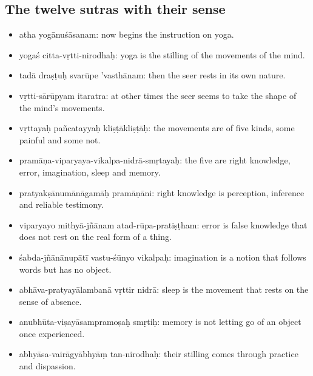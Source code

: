 \subsection*{The twelve sutras with their sense}
\begin{itemize}
\item atha yogānuśāsanam: now begins the instruction on yoga.
\item yogaś citta-vṛtti-nirodhaḥ: yoga is the stilling of the movements of the mind.
\item tadā draṣṭuḥ svarūpe 'vasthānam: then the seer rests in its own nature.
\item vṛtti-sārūpyam itaratra: at other times the seer seems to take the shape of the mind's movements.
\item vṛttayaḥ pañcatayyaḥ kliṣṭākliṣṭāḥ: the movements are of five kinds, some painful and some not.
\item pramāṇa-viparyaya-vikalpa-nidrā-smṛtayaḥ: the five are right knowledge, error, imagination, sleep and memory.
\item pratyakṣānumānāgamāḥ pramāṇāni: right knowledge is perception, inference and reliable testimony.
\item viparyayo mithyā-jñānam atad-rūpa-pratiṣṭham: error is false knowledge that does not rest on the real form of a thing.
\item śabda-jñānānupātī vastu-śūnyo vikalpaḥ: imagination is a notion that follows words but has no object.
\item abhāva-pratyayālambanā vṛttir nidrā: sleep is the movement that rests on the sense of absence.
\item anubhūta-viṣayāsampramoṣaḥ smṛtiḥ: memory is not letting go of an object once experienced.
\item abhyāsa-vairāgyābhyāṃ tan-nirodhaḥ: their stilling comes through practice and dispassion.
\end{itemize}

